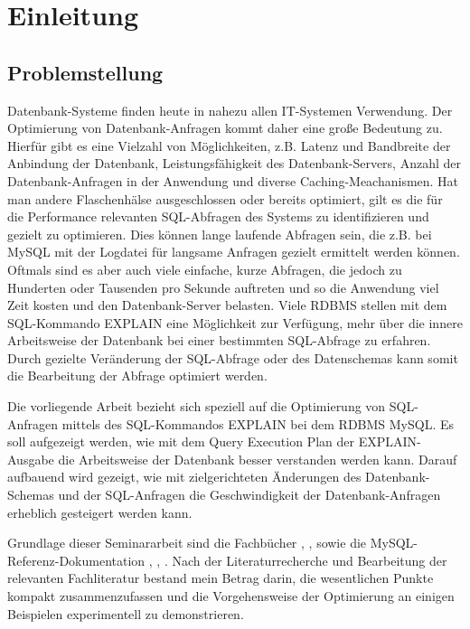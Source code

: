 
\section{Einleitung}

\subsection{Problemstellung}
Datenbank-Systeme finden heute in nahezu allen IT-Systemen Verwendung.
Der Optimierung von Datenbank-Anfragen kommt daher eine große Bedeutung zu.
Hierfür gibt es eine Vielzahl von Möglichkeiten, z.B. Latenz und Bandbreite der Anbindung der Datenbank, Leistungsfähigkeit des Datenbank-Servers, Anzahl der Datenbank-Anfragen in der Anwendung und diverse Caching-Meachanismen.
Hat man andere Flaschenhälse ausgeschlossen oder bereits optimiert,  gilt es die für die Performance relevanten SQL-Abfragen des Systems zu identifizieren und gezielt zu optimieren. Dies können lange laufende Abfragen sein, die z.B. bei MySQL mit der Logdatei für langsame Anfragen gezielt ermittelt werden können. Oftmals sind es aber auch viele einfache, kurze Abfragen, die jedoch zu Hunderten oder Tausenden pro Sekunde auftreten und so die Anwendung viel Zeit kosten und den Datenbank-Server belasten.
Viele RDBMS stellen mit dem SQL-Kommando EXPLAIN eine Möglichkeit zur Verfügung, mehr über die innere Arbeitsweise der Datenbank bei einer bestimmten SQL-Abfrage zu erfahren. Durch gezielte Veränderung der SQL-Abfrage oder des Datenschemas kann somit die Bearbeitung der Abfrage optimiert werden.

Die vorliegende Arbeit bezieht sich speziell auf die Optimierung von SQL-Anfragen mittels des SQL-Kommandos EXPLAIN bei dem RDBMS MySQL.
Es soll aufgezeigt werden, wie mit dem Query Execution Plan der EXPLAIN-Ausgabe die Arbeitsweise der Datenbank besser verstanden werden kann. Darauf aufbauend wird gezeigt, wie mit zielgerichteten Änderungen des Datenbank-Schemas und der SQL-Anfragen die Geschwindigkeit der Datenbank-Anfragen erheblich gesteigert werden kann.

Grundlage dieser Seminararbeit sind die Fachbücher \cite{Bradford2011}, \cite{Sauer1998}, \cite{Schwartz2009} sowie die MySQL-Referenz-Dokumentation \cite{refman1}, \cite{refman2}, \cite{refman3}.
Nach der Literaturrecherche und Bearbeitung der relevanten Fachliteratur bestand mein Betrag darin, die wesentlichen Punkte kompakt zusammenzufassen und die Vorgehensweise der Optimierung an einigen Beispielen experimentell zu demonstrieren.

